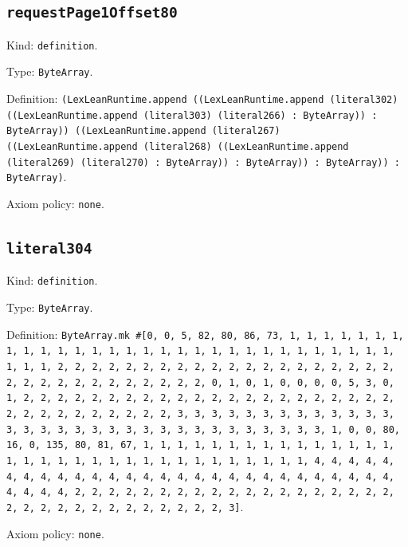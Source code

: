 \documentclass[11pt]{article}
\begin{document}
\subsection*{\texttt{requestPage1Offset80}}
\noindent Kind: \texttt{definition}.\par
\noindent Type: \texttt{ByteArray}.\par
\noindent Definition: \texttt{(LexLeanRuntime.append ((LexLeanRuntime.append (literal302) ((LexLeanRuntime.append (literal303) (literal266) : ByteArray)) : ByteArray)) ((LexLeanRuntime.append (literal267) ((LexLeanRuntime.append (literal268) ((LexLeanRuntime.append (literal269) (literal270) : ByteArray)) : ByteArray)) : ByteArray)) : ByteArray)}.\par
\noindent Axiom policy: \texttt{none}.\par
\subsection*{\texttt{literal304}}
\noindent Kind: \texttt{definition}.\par
\noindent Type: \texttt{ByteArray}.\par
\noindent Definition: \texttt{ByteArray.mk \#[0, 0, 5, 82, 80, 86, 73, 1, 1, 1, 1, 1, 1, 1, 1, 1, 1, 1, 1, 1, 1, 1, 1, 1, 1, 1, 1, 1, 1, 1, 1, 1, 1, 1, 1, 1, 1, 1, 1, 1, 2, 2, 2, 2, 2, 2, 2, 2, 2, 2, 2, 2, 2, 2, 2, 2, 2, 2, 2, 2, 2, 2, 2, 2, 2, 2, 2, 2, 2, 2, 2, 2, 0, 1, 0, 1, 0, 0, 0, 0, 5, 3, 0, 1, 2, 2, 2, 2, 2, 2, 2, 2, 2, 2, 2, 2, 2, 2, 2, 2, 2, 2, 2, 2, 2, 2, 2, 2, 2, 2, 2, 2, 2, 2, 2, 2, 3, 3, 3, 3, 3, 3, 3, 3, 3, 3, 3, 3, 3, 3, 3, 3, 3, 3, 3, 3, 3, 3, 3, 3, 3, 3, 3, 3, 3, 3, 3, 3, 1, 0, 0, 80, 16, 0, 135, 80, 81, 67, 1, 1, 1, 1, 1, 1, 1, 1, 1, 1, 1, 1, 1, 1, 1, 1, 1, 1, 1, 1, 1, 1, 1, 1, 1, 1, 1, 1, 1, 1, 1, 1, 1, 4, 4, 4, 4, 4, 4, 4, 4, 4, 4, 4, 4, 4, 4, 4, 4, 4, 4, 4, 4, 4, 4, 4, 4, 4, 4, 4, 4, 4, 4, 4, 4, 2, 2, 2, 2, 2, 2, 2, 2, 2, 2, 2, 2, 2, 2, 2, 2, 2, 2, 2, 2, 2, 2, 2, 2, 2, 2, 2, 2, 2, 2, 2, 2, 3]}.\par
\noindent Axiom policy: \texttt{none}.\par
\end{document}
